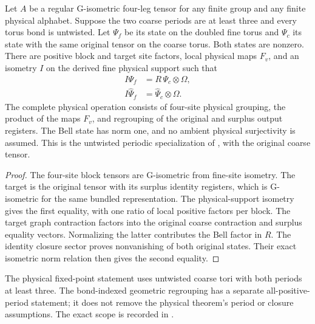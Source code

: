 \begin{lemma}%
    \label{thm:peps_two_by_two_original_normalized}
    \leanok
    Let $A$ be a regular G-isometric four-leg tensor for any finite group
    and any finite physical alphabet. Suppose the two coarse periods are
    at least three and every torus bond is untwisted. Let $\Psi_f$ be its
    state on the doubled fine torus and $\Psi_c$ its state
    with the same original tensor on the coarse torus. Both states are
    nonzero. There are positive block and target site factors, local
    physical maps $F_v$, and an isometry $I$ on the derived fine physical
    support such that
    \begin{align}
        I\Psi_f         & =R\,\Psi_c\otimes\Omega,      \\
        I\widehat\Psi_f & =\widehat\Psi_c\otimes\Omega.
    \end{align}
    The complete physical operation consists of four-site physical
    grouping, the product of the maps $F_v$, and regrouping of the original
    and surplus output registers. The Bell state has norm one, and no
    ambient physical surjectivity is assumed. This is the untwisted
    periodic specialization of
    \cite[Observation~6.6]{Schuch2010PEPS}, with the original coarse tensor.
\end{lemma}

\begin{proof}\leanok
    The four-site block tensors are G-isometric from fine-site
    isometry. The target is the original tensor with its surplus identity
    registers, which is G-isometric for the same bundled representation.
    The physical-support isometry gives the first equality, with one ratio
    of local positive factors per block. The target graph contraction
    factors into the original coarse contraction and surplus equality
    vectors. Normalizing the latter contributes the Bell factor in $R$.
    The identity closure sector proves nonvanishing of both original
    states. Their exact isometric norm relation then gives the second
    equality.
\end{proof}

The physical fixed-point statement uses untwisted coarse tori with both
periods at least three. The bond-indexed geometric regrouping has a separate
all-positive-period statement; it does not remove the physical theorem's
period or closure assumptions. The exact scope is recorded in
\cite{gap:scp10_two_by_two_regular_fixed_point}.
